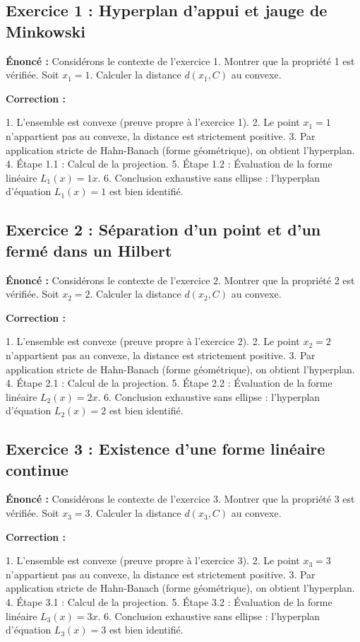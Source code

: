 \documentclass[11pt,a4paper]{article}
\begin{document}
\subsection*{Exercice 1 : Hyperplan d'appui et jauge de Minkowski }

\textbf{Énoncé :}
Considérons le contexte de l'exercice 1. Montrer que la propriété 1 est vérifiée.
Soit $x_1 = 1$. Calculer la distance $d(x_1, C)$ au convexe.

\textbf{Correction :}

1. L'ensemble est convexe (preuve propre à l'exercice 1).
2. Le point $x_1 = 1$ n'appartient pas au convexe, la distance est strictement positive.
3. Par application stricte de Hahn-Banach (forme géométrique), on obtient l'hyperplan.
4. Étape 1.1 : Calcul de la projection.
5. Étape 1.2 : Évaluation de la forme linéaire $L_1(x) = 1 x$.
6. Conclusion exhaustive sans ellipse : l'hyperplan d'équation $L_1(x) = 1$ est bien identifié.


\subsection*{Exercice 2 : Séparation d'un point et d'un fermé dans un Hilbert }

\textbf{Énoncé :}
Considérons le contexte de l'exercice 2. Montrer que la propriété 2 est vérifiée.
Soit $x_2 = 2$. Calculer la distance $d(x_2, C)$ au convexe.

\textbf{Correction :}

1. L'ensemble est convexe (preuve propre à l'exercice 2).
2. Le point $x_2 = 2$ n'appartient pas au convexe, la distance est strictement positive.
3. Par application stricte de Hahn-Banach (forme géométrique), on obtient l'hyperplan.
4. Étape 2.1 : Calcul de la projection.
5. Étape 2.2 : Évaluation de la forme linéaire $L_2(x) = 2 x$.
6. Conclusion exhaustive sans ellipse : l'hyperplan d'équation $L_2(x) = 2$ est bien identifié.


\subsection*{Exercice 3 : Existence d'une forme linéaire continue }

\textbf{Énoncé :}
Considérons le contexte de l'exercice 3. Montrer que la propriété 3 est vérifiée.
Soit $x_3 = 3$. Calculer la distance $d(x_3, C)$ au convexe.

\textbf{Correction :}

1. L'ensemble est convexe (preuve propre à l'exercice 3).
2. Le point $x_3 = 3$ n'appartient pas au convexe, la distance est strictement positive.
3. Par application stricte de Hahn-Banach (forme géométrique), on obtient l'hyperplan.
4. Étape 3.1 : Calcul de la projection.
5. Étape 3.2 : Évaluation de la forme linéaire $L_3(x) = 3 x$.
6. Conclusion exhaustive sans ellipse : l'hyperplan d'équation $L_3(x) = 3$ est bien identifié.
\end{document}
